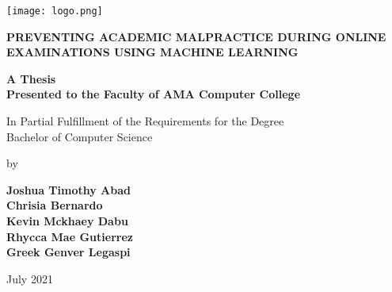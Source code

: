 \begin{titlepage}
   \begin{center}
      \vspace{6em}

      \texttt{[image: logo.png]}

      \begingroup
      \textbf{
         \uppercase{Preventing Academic Malpractice During Online Examinations using Machine Learning}
      }
      \endgroup

      \vspace{6em}

      \textbf{A Thesis\\
         Presented to the Faculty of AMA Computer College}

      \vspace{6em}

      In Partial Fulfillment of the Requirements for the Degree\\
      Bachelor of Computer Science

      \vspace{5em}

      by

      \vspace{3em}

      \textbf{
         Joshua Timothy Abad \\
         Chrisia Bernardo \\
         Kevin Mckhaey Dabu \\
         Rhycca Mae Gutierrez \\
         Greek Genver Legaspi
      }

      \vspace{2em}

      July 2021

   \end{center}
\end{titlepage}
